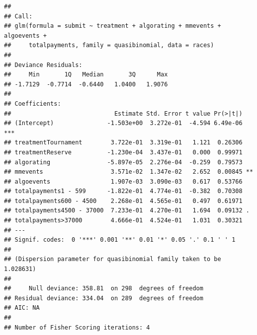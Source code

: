 \documentclass[12pt,]{article}
\theoremstyle{plain} %
\begin{document}
\begin{verbatim}
## 
## Call:
## glm(formula = submit ~ treatment + algorating + mmevents + algoevents + 
##     totalpayments, family = quasibinomial, data = races)
## 
## Deviance Residuals: 
##     Min       1Q   Median       3Q      Max  
## -1.7129  -0.7714  -0.6440   1.0400   1.9076  
## 
## Coefficients:
##                             Estimate Std. Error t value Pr(>|t|)    
## (Intercept)               -1.503e+00  3.272e-01  -4.594 6.49e-06 ***
## treatmentTournament        3.722e-01  3.319e-01   1.121  0.26306    
## treatmentReserve          -1.230e-04  3.437e-01   0.000  0.99971    
## algorating                -5.897e-05  2.276e-04  -0.259  0.79573    
## mmevents                   3.571e-02  1.347e-02   2.652  0.00845 ** 
## algoevents                 1.907e-03  3.090e-03   0.617  0.53766    
## totalpayments1 - 599      -1.822e-01  4.774e-01  -0.382  0.70308    
## totalpayments600 - 4500    2.268e-01  4.565e-01   0.497  0.61971    
## totalpayments4500 - 37000  7.233e-01  4.270e-01   1.694  0.09132 .  
## totalpayments>37000        4.666e-01  4.524e-01   1.031  0.30321    
## ---
## Signif. codes:  0 '***' 0.001 '**' 0.01 '*' 0.05 '.' 0.1 ' ' 1
## 
## (Dispersion parameter for quasibinomial family taken to be 1.028631)
## 
##     Null deviance: 358.81  on 298  degrees of freedom
## Residual deviance: 334.04  on 289  degrees of freedom
## AIC: NA
## 
## Number of Fisher Scoring iterations: 4
\end{verbatim}
\end{document}

